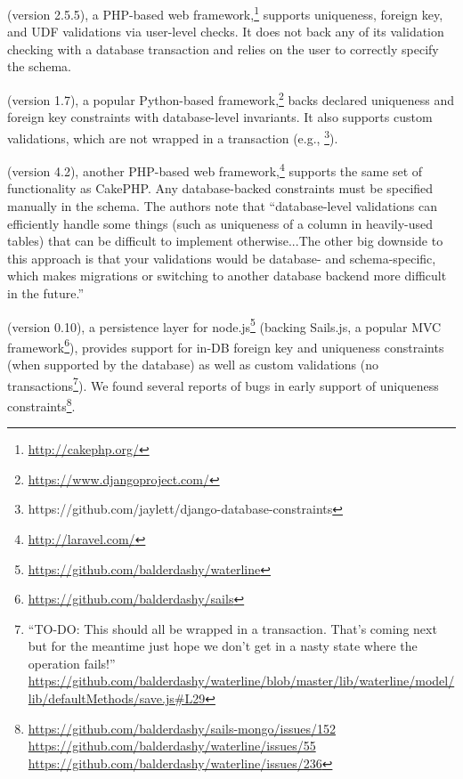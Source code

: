  (version 2.5.5), a PHP-based web
framework,\footnote{\url{http://cakephp.org/}} supports uniqueness,
foreign key, and UDF validations via user-level checks. It does not
back any of its validation checking with a database transaction and
relies on the user to correctly specify the schema.

 (version 1.7), a popular Python-based
framework,\footnote{\url{https://www.djangoproject.com/}} backs declared
uniqueness and foreign key constraints with database-level
invariants. It also supports custom validations, which are not wrapped
in a transaction (e.g., \footnote{https://github.com/jaylett/django-database-constraints}).

 (version 4.2), another PHP-based web framework,\footnote{\url{http://laravel.com/}} supports the same
set of functionality as CakePHP. Any database-backed constraints must
be specified manually in the schema. The authors note that
``database-level validations can efficiently handle some things (such
as uniqueness of a column in heavily-used tables) that can be
difficult to implement otherwise...The other big downside to this
approach is that your validations would be database- and
schema-specific, which makes migrations or switching to another
database backend more difficult in the future.''

 (version 0.10), a persistence layer for
node.js\footnote{\url{https://github.com/balderdashy/waterline}}
(backing Sails.js, a popular MVC
framework\footnote{\url{https://github.com/balderdashy/sails}}),
provides support for in-DB foreign key and uniqueness constraints
(when supported by the database) as well as custom validations (no
transactions\footnote{``TO-DO: This should all be wrapped in a
  transaction. That's coming next but for the meantime just hope we
  don't get in a nasty state where the operation fails!'' \url{https://github.com/balderdashy/waterline/blob/master/lib/waterline/model/lib/defaultMethods/save.js#L29}}). We found several reports of bugs in early support of
uniqueness
constraints\footnote{\url{https://github.com/balderdashy/sails-mongo/issues/152}
  \url{https://github.com/balderdashy/waterline/issues/55}
  \url{https://github.com/balderdashy/waterline/issues/236}}.

